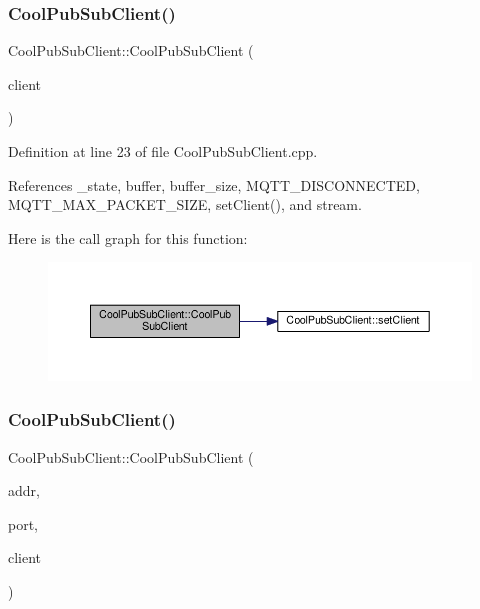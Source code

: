\subsubsection{\texorpdfstring{Cool\+Pub\+Sub\+Client()}{CoolPubSubClient()}\hspace{0.1cm}{\footnotesize\ttfamily [2/14]}}
{\footnotesize\ttfamily Cool\+Pub\+Sub\+Client\+::\+Cool\+Pub\+Sub\+Client (\begin{DoxyParamCaption}\item[{Client \&}]{client }\end{DoxyParamCaption})}



Definition at line 23 of file Cool\+Pub\+Sub\+Client.\+cpp.



References \+\_\+state, buffer, buffer\+\_\+size, M\+Q\+T\+T\+\_\+\+D\+I\+S\+C\+O\+N\+N\+E\+C\+T\+ED, M\+Q\+T\+T\+\_\+\+M\+A\+X\+\_\+\+P\+A\+C\+K\+E\+T\+\_\+\+S\+I\+ZE, set\+Client(), and stream.

Here is the call graph for this function\+:\nopagebreak
\begin{figure}[H]
\begin{center}
\leavevmode
\includegraphics[width=350pt]{d8/d4b/class_cool_pub_sub_client_a0563a12cb4e9339bf2605cfc655e717d_cgraph}
\end{center}
\end{figure}
\mbox{\label{class_cool_pub_sub_client_a4548ad6f306f6181e337a86c0b21a89a}} 
\subsubsection{\texorpdfstring{Cool\+Pub\+Sub\+Client()}{CoolPubSubClient()}\hspace{0.1cm}{\footnotesize\ttfamily [3/14]}}
{\footnotesize\ttfamily Cool\+Pub\+Sub\+Client\+::\+Cool\+Pub\+Sub\+Client (\begin{DoxyParamCaption}\item[{I\+P\+Address}]{addr,  }\item[{uint16\+\_\+t}]{port,  }\item[{Client \&}]{client }\end{DoxyParamCaption})}



